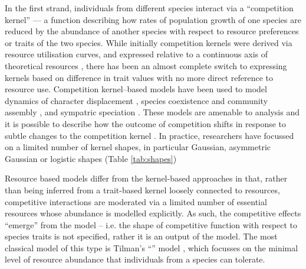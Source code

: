 \documentclass[a4paper,11pt]{article}
\begin{document}
In the first strand, individuals from different species interact via a
``competition kernel'' --- a function describing how rates of
population growth of one species are reduced by the abundance of
another species with respect to resource preferences or traits of the
two species.
%
While initially competition kernels were derived via resource
utilisation curves, and expressed relative to a continuous axis of theoretical resources
\citep{MacArthur-1967, Roughgarden-1979}, there has been an almost
complete switch to expressing kernels based on difference in trait
values with no more direct reference to resource use.
Competition kernel--based models have been used to model dynamics of
character displacement \citep{Taper-1985, Case-2000}, species
coexistence and community assembly \citep{MacArthur-1967,
  Calcagno-2006, Leimar-2013}, and sympatric speciation
\citep{Dieckmann-1999}.
%
These models are amenable to analysis and it is possible to describe how
the outcome of competition shifts in response to subtle changes to the competition
kernel \citep{Calcagno-2006, Scheffer-2006, Pigolotti-2007,
  Leimar-2013}.
%
In practice, researchers have focussed on a limited number of kernel
shapes, in particular Gaussian, asymmetric Gaussian or logistic shapes
(Table \ref{tab:shapes})

Resource based models differ from the kernel-based approaches in that,
rather than being inferred from a trait-based kernel loosely connected to resources, competitive
interactions are moderated via a limited number of essential resources whose abundance is modelled
explicitly.  As such, the competitive effects ``emerge'' from the
model -- i.e. the shape of competitive function with respect to
species traits is not specified, rather it is an output of the model.
%
The most classical model of this type is Tilman's ``\Rstar'' model \citep{Tilman-1977,
  Tilman-1982}, which focusses on the minimal level of resource
abundance that individuals from a species can tolerate.
%
%
\end{document}
